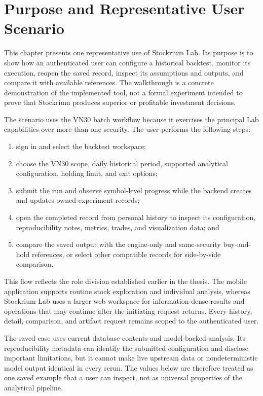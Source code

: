 \section{Purpose and Representative User Scenario}
\label{sec:lab-usage-purpose}

This chapter presents one representative use of Stockrium Lab. Its purpose is to show how an authenticated user can configure a historical backtest, monitor its execution, reopen the saved record, inspect its assumptions and outputs, and compare it with available references. The walkthrough is a concrete demonstration of the implemented tool, not a formal experiment intended to prove that Stockrium produces superior or profitable investment decisions.

The scenario uses the VN30 batch workflow because it exercises the principal Lab capabilities over more than one security. The user performs the following steps:

\begin{enumerate}
    \item sign in and select the backtest workspace;
    \item choose the VN30 scope, daily historical period, supported analytical configuration, holding limit, and exit options;
    \item submit the run and observe symbol-level progress while the backend creates and updates owned experiment records;
    \item open the completed record from personal history to inspect its configuration, reproducibility notes, metrics, trades, and visualization data; and
    \item compare the saved output with the engine-only and same-security buy-and-hold references, or select other compatible records for side-by-side comparison.
\end{enumerate}

This flow reflects the role division established earlier in the thesis. The mobile application supports routine stock exploration and individual analysis, whereas Stockrium Lab uses a larger web workspace for information-dense results and operations that may continue after the initiating request returns. Every history, detail, comparison, and artifact request remains scoped to the authenticated user.

The saved case uses current database contents and model-backed analysis. Its reproducibility metadata can identify the submitted configuration and disclose important limitations, but it cannot make live upstream data or nondeterministic model output identical in every rerun. The values below are therefore treated as one saved example that a user can inspect, not as universal properties of the analytical pipeline.
